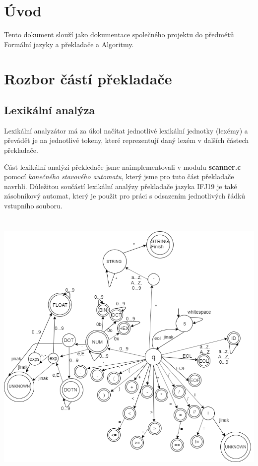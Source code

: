 \documentclass[12pt]{article}
\begin{document}
\tableofcontents
\newpage
\section{Úvod}
Tento dokument slouží jako dokumentace společného projektu do předmětů Formální jazyky a překladače a Algoritmy.
\section{Rozbor částí překladače}
\subsection{Lexikální analýza}
Lexikální analyzátor má za úkol načítat jednotlivé lexikální jednotky (lexémy) a převádět je na jednotlivé tokeny, které reprezentují daný lexém v dalších částech překladače. 

Část lexikální analýzi překledače jsme naimplementovali v modulu \textbf{scanner.c} pomocí \textit{konečného stavového automatu}, který jsme pro tuto část překladače navrhli.
Důležitou součástí lexikální analýzy překladače jazyka IFJ19 je také zásobníkový automat, který je použit pro práci s odsazením jednotlivých řádků vstupního souboru.
\begin{center}
\includegraphics[height = 390pt]{img/Lexical_Analysis.png}
\end{center}
\end{document}
